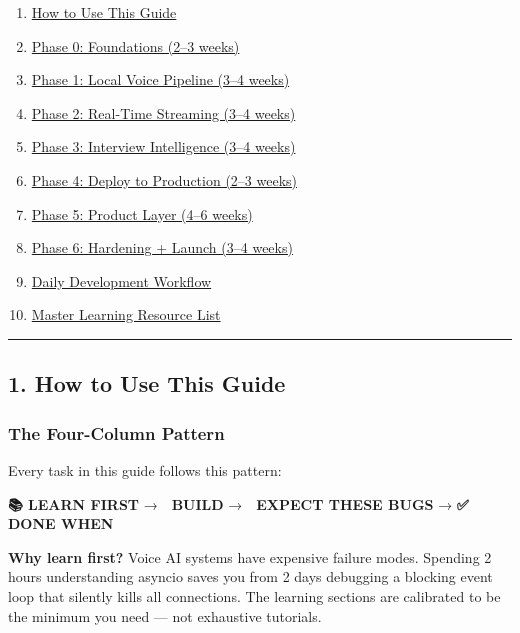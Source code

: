 \documentclass[
  11pt,
]{article}
\providecommand{\tightlist}{%
  \setlength{\itemsep}{0pt}\setlength{\parskip}{0pt}}
\begin{document}
\begin{enumerate}
\def\labelenumi{\arabic{enumi}.}
\tightlist
\item
  \protect\hyperlink{1-how-to-use-this-guide}{How to Use This Guide}
\item
  \protect\hyperlink{2-phase-0-foundations}{Phase 0: Foundations (2--3
  weeks)}
\item
  \protect\hyperlink{3-phase-1-local-voice-pipeline}{Phase 1: Local
  Voice Pipeline (3--4 weeks)}
\item
  \protect\hyperlink{4-phase-2-real-time-streaming}{Phase 2: Real-Time
  Streaming (3--4 weeks)}
\item
  \protect\hyperlink{5-phase-3-interview-intelligence}{Phase 3:
  Interview Intelligence (3--4 weeks)}
\item
  \protect\hyperlink{6-phase-4-deploy-to-production}{Phase 4: Deploy to
  Production (2--3 weeks)}
\item
  \protect\hyperlink{7-phase-5-product-layer}{Phase 5: Product Layer
  (4--6 weeks)}
\item
  \protect\hyperlink{8-phase-6-hardening--launch}{Phase 6: Hardening +
  Launch (3--4 weeks)}
\item
  \protect\hyperlink{9-daily-development-workflow}{Daily Development
  Workflow}
\item
  \protect\hyperlink{10-master-learning-resource-list}{Master Learning
  Resource List}
\end{enumerate}

\begin{center}\rule{0.5\linewidth}{0.5pt}\end{center}

\hypertarget{how-to-use-this-guide}{%
\subsection{1. How to Use This Guide}\label{how-to-use-this-guide}}

\hypertarget{the-four-column-pattern}{%
\subsubsection{The Four-Column Pattern}\label{the-four-column-pattern}}

Every task in this guide follows this pattern:

\textbf{📚 LEARN FIRST} → \textbf{🔨 BUILD} → \textbf{🐛 EXPECT THESE
BUGS} → \textbf{✅ DONE WHEN}

\textbf{Why learn first?} Voice AI systems have expensive failure modes.
Spending 2 hours understanding asyncio saves you from 2 days debugging a
blocking event loop that silently kills all connections. The learning
sections are calibrated to be the minimum you need --- not exhaustive
tutorials.
\end{document}
